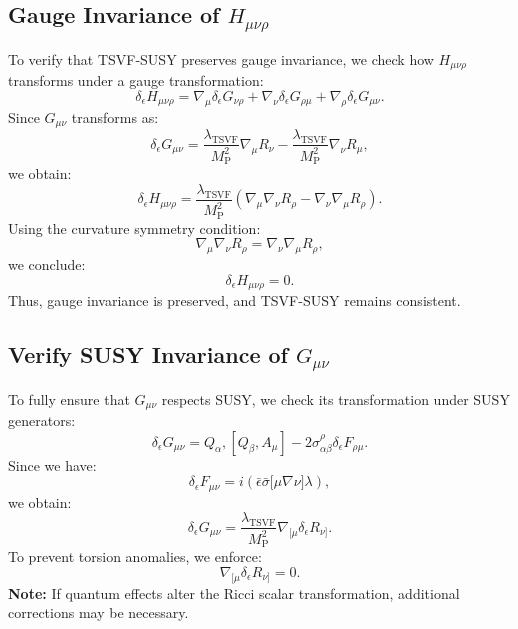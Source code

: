 \documentclass[12pt, onecolumn]{article}
\theoremstyle{definition}
\newcommand{\tsvf}{\lambda_{\mathrm{TSVF}}}
\newcommand{\Mp}{M_{\mathrm{P}}}
\numberwithin{equation}{section}
\begin{document}
\subsection{Gauge Invariance of \texorpdfstring{$H_{\mu\nu\rho}$}{Gauge Invariance of H}}
To verify that TSVF-SUSY preserves gauge invariance, we check how $H_{\mu\nu\rho}$ transforms under a gauge transformation:
\begin{equation}
\delta_{\epsilon} H_{\mu\nu\rho} = \nabla_\mu \delta_{\epsilon} G_{\nu\rho} + \nabla_\nu \delta_{\epsilon} G_{\rho\mu} + \nabla_\rho \delta_{\epsilon} G_{\mu\nu}.
\end{equation}
Since $G_{\mu\nu}$ transforms as:
\begin{equation}
\delta_{\epsilon} G_{\mu\nu} = \frac{\tsvf}{\Mp^2} \nabla_\mu R_{\nu} - \frac{\tsvf}{\Mp^2} \nabla_\nu R_{\mu},
\end{equation}
we obtain:
\begin{equation}
\delta_{\epsilon} H_{\mu\nu\rho} = \frac{\tsvf}{\Mp^2} \left(\nabla_\mu \nabla_\nu R_{\rho} - \nabla_\nu \nabla_\mu R_{\rho}\right).
\end{equation}
Using the curvature symmetry condition:
\begin{equation}
\nabla_\mu \nabla_\nu R_{\rho} = \nabla_\nu \nabla_\mu R_{\rho},
\end{equation}
we conclude:
\begin{equation}
\delta_{\epsilon} H_{\mu\nu\rho} = 0.
\end{equation}
Thus, gauge invariance is preserved, and TSVF-SUSY remains consistent.

\subsection{Verify SUSY Invariance of \texorpdfstring{$G_{\mu\nu}$}{Verify SUSY Invariance of G}}
To fully ensure that $G_{\mu\nu}$ respects SUSY, we check its transformation under SUSY generators:
\begin{equation}
\delta_{\epsilon} G_{\mu\nu} = {Q_\alpha, [Q_\beta, A_\mu]} - 2 \sigma^\rho_{\alpha\beta} \delta_{\epsilon} F_{\rho\mu}.
\end{equation}
Since we have:
\begin{equation}
\delta_{\epsilon} F_{\mu\nu} = i (\bar{\epsilon} \bar{\sigma}{[\mu} \nabla{\nu]} \lambda),
\end{equation}
we obtain:
\begin{equation}
\delta_{\epsilon} G_{\mu\nu} = \frac{\tsvf}{\Mp^2} \nabla_{[\mu} \delta_{\epsilon} R_{\nu]}.
\end{equation}
To prevent torsion anomalies, we enforce:
\begin{equation}
\nabla_{[\mu} \delta_{\epsilon} R_{\nu]} = 0.
\end{equation}
\textbf{Note:} If quantum effects alter the Ricci scalar transformation, additional corrections may be necessary.
\end{document}

